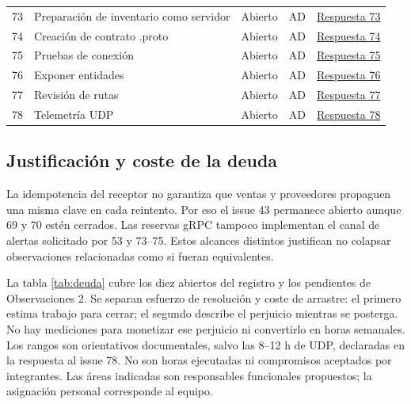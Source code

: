 \documentclass[12pt,a4paper]{article}
\begin{document}
{\begin{longtable}{p{0.6cm}p{6.8cm}p{1.7cm}p{1.1cm}p{2.8cm}}
73 & Preparación de inventario como servidor & Abierto & AD & \href{https://github.com/JoseLozanoMorales/TiendaTech/issues/73#issuecomment-5499964342}{Respuesta 73} \\
74 & Creación de contrato .proto & Abierto & AD & \href{https://github.com/JoseLozanoMorales/TiendaTech/issues/74#issuecomment-5499966747}{Respuesta 74} \\
75 & Pruebas de conexión & Abierto & AD & \href{https://github.com/JoseLozanoMorales/TiendaTech/issues/75#issuecomment-5499968939}{Respuesta 75} \\
76 & Exponer entidades & Abierto & AD & \href{https://github.com/JoseLozanoMorales/TiendaTech/issues/76#issuecomment-5499971165}{Respuesta 76} \\
77 & Revisión de rutas & Abierto & AD & \href{https://github.com/JoseLozanoMorales/TiendaTech/issues/77#issuecomment-5499973475}{Respuesta 77} \\
78 & Telemetría UDP & Abierto & AD & \href{https://github.com/JoseLozanoMorales/TiendaTech/issues/78#issuecomment-5499975479}{Respuesta 78} \\
\bottomrule\end{longtable}}
\subsection{Justificación y coste de la deuda}
La idempotencia del receptor no garantiza que ventas y proveedores propaguen una misma clave en cada reintento. Por eso el issue 43 permanece abierto aunque 69 y 70 estén cerrados. Las reservas gRPC tampoco implementan el canal de alertas solicitado por 53 y 73--75. Estos alcances distintos justifican no colapsar observaciones relacionadas como si fueran equivalentes.

La tabla \ref{tab:deuda} cubre los diez abiertos del registro  y los pendientes de Observaciones 2. Se separan esfuerzo de resolución y coste de arrastre: el primero estima trabajo para cerrar; el segundo describe el perjuicio mientras se posterga. No hay mediciones para monetizar ese perjuicio ni convertirlo en horas semanales. Los rangos son orientativos documentales, salvo las 8--12 h de UDP, declaradas en la respuesta al issue 78. No son horas ejecutadas ni compromisos aceptados por integrantes. Las áreas indicadas son responsables funcionales propuestos; la asignación personal corresponde al equipo.
\end{document}
